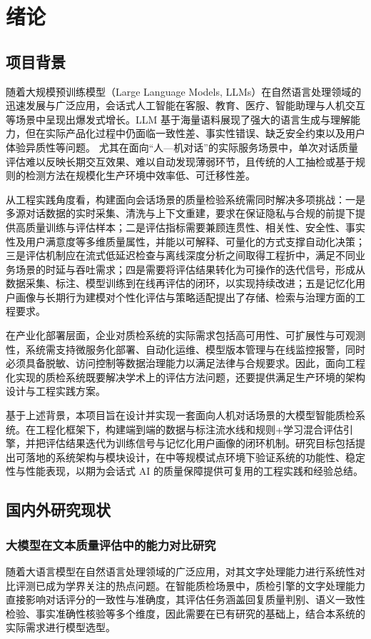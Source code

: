 \chapter{绪论}
\section{项目背景}
随着大规模预训练模型（Large Language Models, LLMs）在自然语言处理领域的迅速发展与广泛应用，会话式人工智能在客服、教育、医疗、智能助理与人机交互等场景中呈现出爆发式增长。LLM 基于海量语料展现了强大的语言生成与理解能力，但在实际产品化过程中仍面临一致性差、事实性错误、缺乏安全约束以及用户体验异质性等问题\cite{rahman2026hallucination,ou2024dialogbench,ganguli2023red}。
尤其在面向“人—机对话”的实际服务场景中，单次对话质量评估难以反映长期交互效果、难以自动发现薄弱环节，且传统的人工抽检或基于规则的检测方法在规模化生产环境中效率低、可迁移性差\cite{jia2024leveraging}。

从工程实践角度看，构建面向会话场景的质量检验系统需同时解决多项挑战：一是多源对话数据的实时采集、清洗与上下文重建，要求在保证隐私与合规的前提下提供高质量训练与评估样本；二是评估指标需要兼顾连贯性、相关性、安全性、事实性及用户满意度等多维质量属性，并能以可解释、可量化的方式支撑自动化决策\cite{hoffman2019metricsexplainableaichallenges}；三是评估机制应在流式低延迟检查与离线深度分析之间取得工程折中，满足不同业务场景的时延与吞吐需求；四是需要将评估结果转化为可操作的迭代信号，形成从数据采集、标注、模型训练到在线再评估的闭环，以实现持续改进；五是记忆化用户画像与长期行为建模对个性化评估与策略适配提出了存储、检索与治理方面的工程要求。

在产业化部署层面，企业对质检系统的实际需求包括高可用性、可扩展性与可观测性，系统需支持微服务化部署、自动化运维、模型版本管理与在线监控报警，同时必须具备脱敏、访问控制等数据治理能力以满足法律与合规要求。因此，面向工程化实现的质检系统既要解决学术上的评估方法问题，还要提供满足生产环境的架构设计与工程实践方案。

基于上述背景，本项目旨在设计并实现一套面向人机对话场景的大模型智能质检系统。在工程化框架下，构建端到端的数据与标注流水线和规则+学习混合评估引擎，并把评估结果迭代为训练信号与记忆化用户画像的闭环机制。研究目标包括提出可落地的系统架构与模块设计，在中等规模试点环境下验证系统的功能性、稳定性与性能表现，以期为会话式 AI 的质量保障提供可复用的工程实践和经验总结。
\section{国内外研究现状}
\subsection{大模型在文本质量评估中的能力对比研究}
随着大语言模型在自然语言处理领域的广泛应用，对其文字处理能力进行系统性对比评测已成为学界关注的热点问题。在智能质检场景中，质检引擎的文字处理能力直接影响对话评分的一致性与准确度，其评估任务涵盖回复质量判别、语义一致性检验、事实准确性核验等多个维度，因此需要在已有研究的基础上，结合本系统的实际需求进行模型选型。

